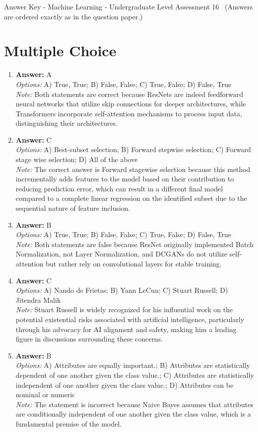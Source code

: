 \documentclass[12pt]{article}
\begin{document}
\begin{center}
Answer Key - Machine Learning - Undergraduate Level Assessment 16 \
\small (Answers are ordered exactly as in the question paper.)
\end{center}

\section*{Multiple Choice}
\begin{enumerate}[label=\arabic*.]
\item \textbf{Answer:} A
\\ \textit{Options:} A) True, True; B) False, False; C) True, False; D) False, True
\\ \textit{Note:} Both statements are correct because ResNets are indeed feedforward neural networks that utilize skip connections for deeper architectures, while Transformers incorporate self-attention mechanisms to process input data, distinguishing their architectures.
\item \textbf{Answer:} C
\\ \textit{Options:} A) Best-subset selection; B) Forward stepwise selection; C) Forward stage wise selection; D) All of the above
\\ \textit{Note:} The correct answer is Forward stagewise selection because this method incrementally adds features to the model based on their contribution to reducing prediction error, which can result in a different final model compared to a complete linear regression on the identified subset due to the sequential nature of feature inclusion.
\item \textbf{Answer:} B
\\ \textit{Options:} A) True, True; B) False, False; C) True, False; D) False, True
\\ \textit{Note:} Both statements are false because ResNet originally implemented Batch Normalization, not Layer Normalization, and DCGANs do not utilize self-attention but rather rely on convolutional layers for stable training.
\item \textbf{Answer:} C
\\ \textit{Options:} A) Nando de Frietas; B) Yann LeCun; C) Stuart Russell; D) Jitendra Malik
\\ \textit{Note:} Stuart Russell is widely recognized for his influential work on the potential existential risks associated with artificial intelligence, particularly through his advocacy for AI alignment and safety, making him a leading figure in discussions surrounding these concerns.
\item \textbf{Answer:} B
\\ \textit{Options:} A) Attributes are equally important.; B) Attributes are statistically dependent of one another given the class value.; C) Attributes are statistically independent of one another given the class value.; D) Attributes can be nominal or numeric
\\ \textit{Note:} The statement is incorrect because Naive Bayes assumes that attributes are conditionally independent of one another given the class value, which is a fundamental premise of the model.
\end{enumerate}
\end{document}
